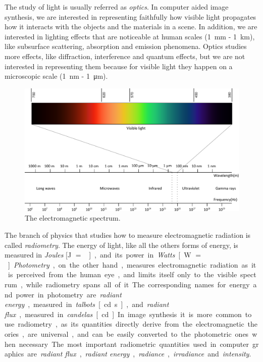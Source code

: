 The study of light is usually referred as \emph{optics}. In computer aided image synthesis, we are interested in representing faithfully how visible light propagates how it interacts with the objects and the materials in a scene. In addition, we are interested in lighting effects that are noticeable at human scales (\SI{1}{\milli\meter} - \SI{1}{\kilo\meter}), like subsurface scattering, absorption and emission phenomena. Optics studies more effects, like diffraction, interference and quantum effects, but we are not interested in representing them because for visible light they happen on a microscopic scale (\SI{1}{\nano\meter} - \SI{1}{\micro\meter}). 

\begin{figure}[!ht]
\centering
\includegraphics[width=1.0\textwidth]{images/spectrum.pdf}
\caption{The electromagnetic spectrum.}
\label{fig:spectrum}
\end{figure}

The branch of physics that studies how to measure electromagnetic radiation is called \emph{radiometry}. The energy of light, like all the others forms of energy, is measured in \emph{Joules} [\si{\joule} $=$ \si{\kg\meter\square\per\second\square}], and its power in \emph{Watts} [\si{\watt} $=$ \si{\kg\meter\square\per\second\cubed}]. \emph{Photometry}, on the other hand, measures electromagnetic radiation as it is perceived from the human eye, and limits itself only to the visible spectrum, while radiometry spans all of it. The corresponding names for energy and power in photometry are \emph{radiant energy}, measured in \emph{talbots} [\si{\candela\second}], and \emph{radiant flux}, measured in \emph{candelas} [\si{\candela}]. 

In image synthesis it is more common to use radiometry, as its quantities directly derive from the electromagnetic theories, are universal, and can be easily converted to the photometric ones when necessary. The most important radiometric quantities used in computer graphics are \emph{radiant flux}, \emph{radiant energy}, \emph{radiance}, \emph{irradiance} and \emph{intensity}.

